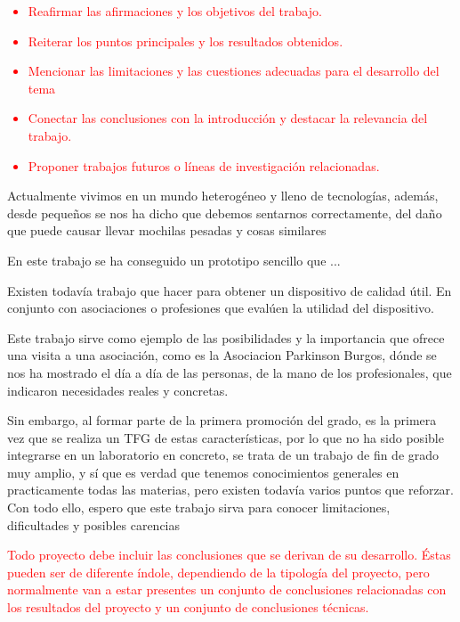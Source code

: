 \textcolor{red}{
\begin{itemize}
    \item Reafirmar las afirmaciones y los objetivos del trabajo.
    \item Reiterar los puntos principales y los resultados obtenidos.
    \item Mencionar las limitaciones y las cuestiones adecuadas para el desarrollo del tema
    \item Conectar las conclusiones con la introducción y destacar la relevancia del trabajo.
    \item Proponer trabajos futuros o líneas de investigación relacionadas.
\end{itemize}
}

Actualmente vivimos en un mundo heterogéneo y lleno de tecnologías, además, desde pequeños se nos ha dicho que debemos sentarnos correctamente, del daño que puede causar llevar mochilas pesadas y cosas similares 

En este trabajo se ha conseguido un prototipo sencillo que ...

Existen todavía trabajo que hacer para obtener un dispositivo de calidad útil. En conjunto con asociaciones o profesiones que evalúen la utilidad del dispositivo.



Este trabajo sirve como ejemplo de las posibilidades y la importancia que ofrece una visita a una asociación, como es la Asociacion Parkinson Burgos, dónde se nos ha mostrado el día a día de las personas, de la mano de los profesionales, que indicaron necesidades reales y concretas. 

Sin embargo, al formar parte de la primera promoción del grado, es la primera vez que se realiza un TFG de estas características, por lo que no ha sido posible integrarse en un laboratorio en concreto, se trata de un trabajo de fin de grado muy amplio, y sí que es verdad que tenemos conocimientos generales en practicamente todas las materias, pero existen todavía varios puntos que reforzar. Con todo ello, espero que este trabajo sirva para conocer limitaciones, dificultades y posibles carencias 


\textcolor{red}{Todo proyecto debe incluir las conclusiones que se derivan de su desarrollo. Éstas pueden ser de diferente índole, dependiendo de la tipología del proyecto, pero normalmente van a estar presentes un conjunto de conclusiones relacionadas con los resultados del proyecto y un conjunto de conclusiones técnicas. }

